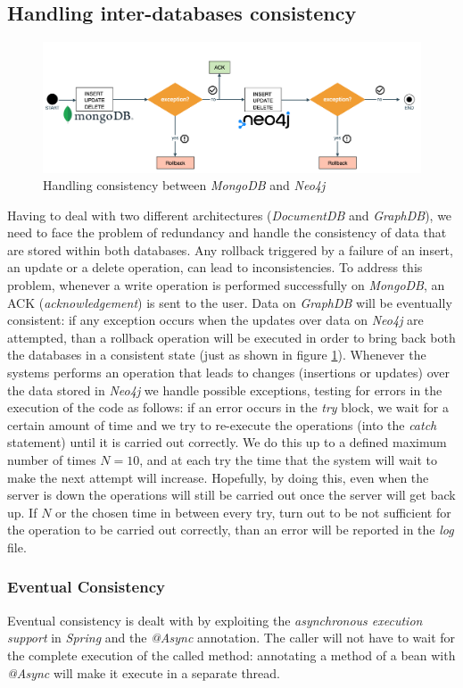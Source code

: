 \subsection{Handling inter-databases consistency}
\begin{figure}[t]
	\centering
	\includegraphics[width=1\textwidth]{chapter3/img/rollback.png}
	\caption{Handling consistency between \emph{MongoDB} and \emph{Neo4j}}
	\label{fig:rb}
\end{figure}
Having to deal with two different architectures (\emph{DocumentDB} and \emph{GraphDB}), we need to face the problem of redundancy and handle the consistency of data that are stored within both databases. 
Any rollback triggered by a failure of an insert, an update or a delete operation, can lead to inconsistencies. 
To address this problem, whenever a write operation  is performed successfully on \emph{MongoDB}, an ACK (\emph{acknowledgement}) is sent to the user. Data on \emph{GraphDB} will be eventually consistent: if any exception occurs when the updates over data on \emph{Neo4j} are attempted, than a rollback operation will be executed in order to bring back both the databases in a consistent state (just as shown in figure \ref{fig:rb}).
Whenever the systems performs an operation that leads to changes (insertions or updates) over the data stored in \emph{Neo4j} we handle possible exceptions, testing for errors in the execution of the code as follows: if an error occurs in the \emph{try} block, we wait for a certain amount of time and we try to re-execute the operations (into the \emph{catch} statement) until it is carried out correctly. 
We do this up to a defined maximum number of times $N = 10$, and at each try the time that the system will wait to make the next attempt will increase. Hopefully, by doing this, even when the server is down the operations will still be carried out once the server will get back up. If $N$ or the chosen time in between every try,  turn out to be not sufficient for the operation to be carried out correctly, than an error will be reported in the \emph{log} file. 
\subsubsection{Eventual Consistency}
Eventual consistency is dealt with by exploiting the \emph{asynchronous execution support} in \emph{Spring} and the \emph{@Async} annotation.
The caller will not have to wait for the complete execution of the called method: annotating a method of a bean with \emph{@Async} will make it execute in a separate thread. 
